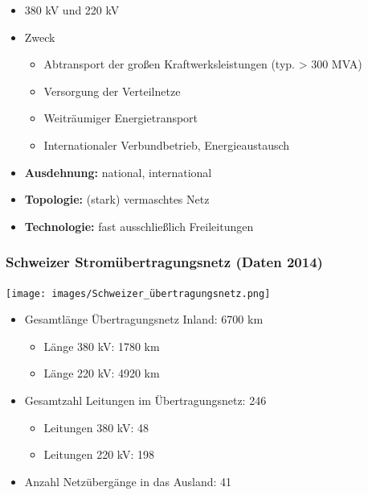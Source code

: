 \begin{itemize}
    \item 380 kV und 220 kV
    \item Zweck
    \begin{itemize}
        \item Abtransport der großen Kraftwerksleistungen (typ. > 300 MVA)
        \item Versorgung der Verteilnetze
        \item Weiträumiger Energietransport
        \item Internationaler Verbundbetrieb, Energieaustausch
    \end{itemize}
    \item \textbf{Ausdehnung:} national, international
    \item \textbf{Topologie:} (stark) vermaschtes Netz
    \item \textbf{Technologie:} fast ausschließlich Freileitungen
\end{itemize}

\subsubsection{Schweizer Stromübertragungsnetz (Daten 2014)}

\begin{center}
    \texttt{[image: images/Schweizer\_übertragungsnetz.png]}
\end{center}

\begin{itemize}
    \item Gesamtlänge Übertragungsnetz Inland: 6700 km
    \begin{itemize}
        \item Länge 380 kV: 1780 km
        \item Länge 220 kV: 4920 km
    \end{itemize}
    
    \item Gesamtzahl Leitungen im Übertragungsnetz: 246
    \begin{itemize}
        \item Leitungen 380 kV: 48
        \item Leitungen 220 kV: 198
    \end{itemize}
    
    \item Anzahl Netzübergänge in das Ausland: 41
\end{itemize}

